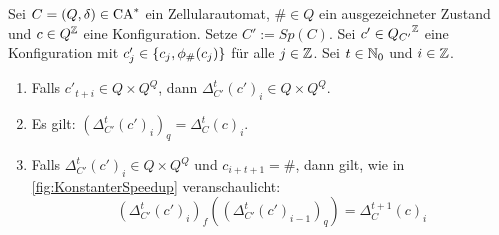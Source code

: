 \begin{satz}
    \label{satzSpeedupConstruction}
    Sei $C = (Q, \delta) \in \textrm{CA}^*$ ein Zellularautomat, $\# \in Q$ ein ausgezeichneter Zustand
    und $c \in Q^{\mathbb{Z}}$ eine Konfiguration.
    Setze $C' := Sp(C)$.
    Sei $c' \in {Q_{C'}}^{\mathbb{Z}}$ eine Konfiguration mit $c'_j \in \{ {c_j, \phi_{\#}(c_j)} \}$ für alle $j \in \mathbb{Z}$. Sei $t \in \mathbb{N}_0$ und $i \in \mathbb{Z}$.
    
    \begin{enumerate}
        \item
            Falls $c'_{t+i} \in Q \times Q^Q$, dann $\Delta^t_{C'}(c')_i \in Q \times Q^Q$.
        \item
            Es gilt: $(\Delta^t_{C'}(c')_i)_q = \Delta^t_{C}(c)_i$.
        \item
            Falls $\Delta^t_{C'}(c')_i \in Q \times Q^Q$ und $c_{i+t+1} = \#$, dann gilt, wie in \cref{fig:KonstanterSpeedup} veranschaulicht:
            \[(\Delta^t_{C'}(c')_i)_f((\Delta^t_{C'}(c')_{i-1})_q) = \Delta^{t+1}_C(c)_i\]
    \end{enumerate}
\end{satz}

